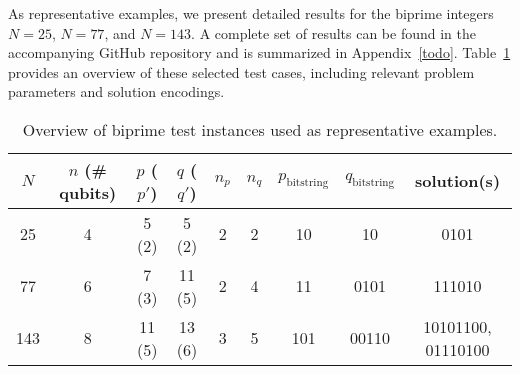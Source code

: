 As representative examples, we present detailed results for the biprime integers $N = 25$, $N = 77$,
and $N = 143$. A complete set of results can be found in the accompanying GitHub repository
and is summarized in Appendix~\ref{todo}. Table~\ref{tab:instances_overview} provides an overview of
these selected test cases, including relevant problem parameters and solution encodings.
\begin{table}[h]
    \centering
    \begin{tabular}{@{}ccccccccc@{}}
        \toprule
        $N$ & $n$ (\# qubits) & $p$ ($p'$) & $q$ ($q'$) & $n_p$ & $n_q$ & $p_\mathrm{bitstring}$ & $q_\mathrm{bitstring}$ & solution(s) \\
        \midrule
        25  & 4          & 5 (2)      & 5 (2)      & 2     & 2     & 10                     & 10                     & 0101                  \\
        77  & 6          & 7 (3)      & 11 (5)     & 2     & 4     & 11                     & 0101                   & 111010                \\
        143 & 8          & 11 (5)     & 13 (6)     & 3     & 5     & 101                    & 00110                  & 10101100, 01110100    \\
        \bottomrule
    \end{tabular}
    \caption{Overview of biprime test instances used as representative examples.}
    \label{tab:instances_overview}
\end{table}

